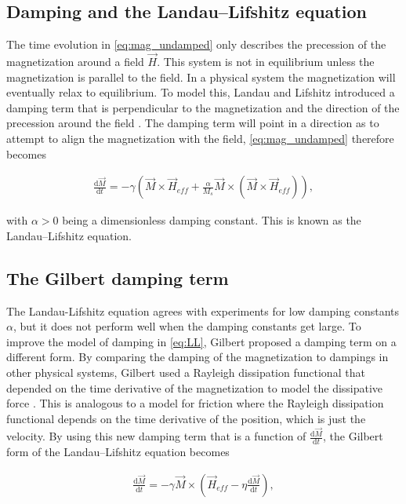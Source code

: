 \documentclass[1p]{elsarticle}		%
\begin{document}
\subsection{Damping and the Landau--Lifshitz equation}
The time evolution in \eqref{eq:mag_undamped} only describes the precession of the magnetization around a field $\vec{H}$. This system is not in equilibrium unless the magnetization is parallel to the field. In a physical system the magnetization will eventually relax to equilibrium. To model this, Landau and Lifshitz introduced a damping term that is perpendicular to the magnetization and the direction of the precession around the field \cite{LandauLifshitz1935}. The damping term will point in a direction as to attempt to align the magnetization with the field, \eqref{eq:mag_undamped} therefore becomes

\begin{align}
\label{eq:LL}
\frac{\textrm{d} \vec{M}}{\textrm{d} t} = -\gamma (\vec{M} \times \vec{H}_{eff} + \frac{\alpha}{M_s} \vec{M}\times(\vec{M}\times\vec{H}_{eff})),
\end{align}

with $\alpha > 0$ being a dimensionless damping constant. This is known as the Landau--Lifshitz equation.

\subsection{The Gilbert damping term}
The Landau-Lifshitz equation agrees with experiments for low damping constants $\alpha$, but it does not perform well when the damping constants get large. To improve the model of damping in \eqref{eq:LL}, Gilbert proposed a damping term on a different form. By comparing the damping of the magnetization to dampings in other physical systems, Gilbert used a Rayleigh dissipation functional that depended on the time derivative of the magnetization to model the dissipative force \cite{Gilbert2004Classics}. This is analogous to a model for friction where the Rayleigh dissipation functional depends on the time derivative of the position, which is just the velocity. By using this new damping term that is a function of $\frac{\textrm{d} \vec{M}}{\textrm{d} t}$, the Gilbert form of the Landau--Lifshitz equation becomes

\begin{align}
\label{eq:LLG_implicit}
\frac{\textrm{d} \vec{M}}{\textrm{d} t} = -\gamma \vec{M} \times (\vec{H}_{eff} - \eta \frac{\textrm{d} \vec{M}}{\textrm{d} t}),
\end{align}
\end{document}
